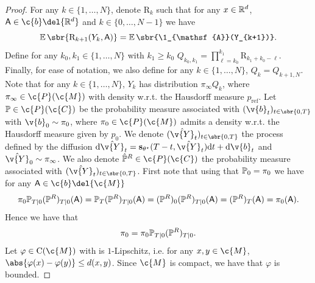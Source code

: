 \begin{proof}
	For any $k \in \{1, \dots, N\}$, denote $\mathrm{R}_k$ such that for any $x \in \mathbb{R}^d$, $\mathsf{A} \in \c{b}\del{\R^d}$ and $k \in \{0, \dots, N-1\}$ we have \begin{equation} \textstyle{\E\sbr{\mathrm{R}_{k+1}(Y_k, \mathsf{A})} = \E\sbr{\1_{\mathsf{A}}(Y_{k+1})} .
		}
	\end{equation}
	Define for any $k_0, k_1 \in \{1, \dots, N\}$ with $k_1 \geq k_0$ $Q_{k_0, k_1} = \prod_{\ell = k_0}^{k_1} \mathrm{R}_{k_1 + k_0 - \ell}$.
	Finally, for ease of notation, we also define for any $k \in \{1, \dots, N\}$, $Q_k = Q_{k+1,N}$.
	Note that for any $k \in \{1, \dots, N\}$, $Y_k$ has distribution $\pi_{\infty} Q_k$, where $\pi_{\infty}\in \c{P}(\c{M})$ with density w.r.t.
	the Hausdorff measure $p_{\mathrm{ref}}$.
	Let $\bb{P} \in \c{P}(\c{C})$ be the probability measure associated with $(\v{b}_t)_{t \in \sbr{0,T}}$ with $\v{b}_0 \sim \pi_0$, where $\pi_0 \in \c{P}(\c{M})$ admits a density w.r.t.
	the Hausdorff measure given by $p_0$.
	We denote $(\hat{\v{Y}}_t)_{t \in \sbr{0,T}}$ the process defined by the diffusion $\mathrm{d} \hat{\v{Y}}_t = \mathbf{s}_{\theta^\star}(T-t, \hat{\v{Y}}_t) \mathrm{d} t + \mathrm{d} \v{b}_t$ and $\hat{\v{Y}}_0 \sim \pi_\infty$.
	We also denote $\hat{\bb{P}}^R \in \c{P}(\c{C})$ the probability measure associated with $(\hat{\v{Y}}_t)_{t \in \sbr{0,T}}$.
	First note that using that $\bb{P}_0 = \pi_0$ we have for any $\mathsf{A} \in \c{b}\del{\c{M}}$ \begin{equation} \pi_0 \bb{P}_{T|0} (\bb{P}^R)_{T|0} (\mathsf{A}) = \bb{P}_T (\bb{P}^R)_{T|0} (\mathsf{A}) = (\bb{P}^R)_0 (\bb{P}^R)_{T|0} (\mathsf{A}) = (\bb{P}^R)_T(\mathsf{A}) = \pi_0(\mathsf{A}) .
	\end{equation}
	Hence we have that \begin{equation} \label{eq:equality_backward} \pi_0 = \pi_0 \bb{P}_{T|0} (\bb{P}^R)_{T|0} .
	\end{equation}
	Let $\varphi \in \mathrm{C}(\c{M})$ with is $1$-Lipschitz, i.e. for any $x,y \in \c{M}$, $\abs{\varphi(x) - \varphi(y)} \leq d(x,y)$.
	Since $\c{M}$ is compact, we have that $\varphi$ is bounded.

\end{proof}
